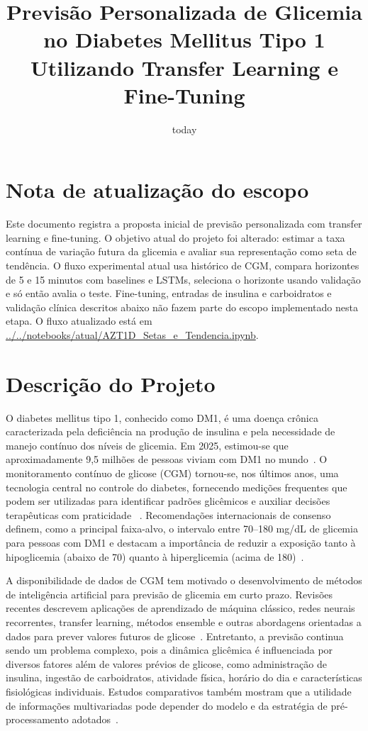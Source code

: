 \documentclass[conference]{IEEEtran}
\title{Previsão Personalizada de Glicemia no Diabetes Mellitus Tipo 1 Utilizando Transfer Learning e Fine-Tuning}
\author{
\IEEEauthorblockA{Experiência Criativa: Projeto Transformador II\\
Bacharelado em Ciência da Computação -- PUCPR
\\[3ex]
Turma 8° B -- Equipe 3 \\
Gustavo Faria Cardoso, Mateus da Silva Maciel de Lima, Pedro Costa Lyra \\
{\tt\small \{faria.cardoso, maciel.mateus, lyra.pedro, \}@pucpr.edu.br}
}
}
\date{today}
\begin{document}
\maketitle

\section*{Nota de atualização do escopo}
Este documento registra a proposta inicial de previsão personalizada com
transfer learning e fine-tuning. O objetivo atual do projeto foi alterado:
estimar a taxa contínua de variação futura da glicemia e avaliar sua
representação como seta de tendência. O fluxo experimental atual usa histórico
de CGM, compara horizontes de 5 e 15 minutos com baselines e LSTMs, seleciona o
horizonte usando validação e só então avalia o teste. Fine-tuning, entradas de
insulina e carboidratos e validação clínica descritos abaixo não fazem parte do
escopo implementado nesta etapa. O fluxo atualizado está em
\url{../../notebooks/atual/AZT1D_Setas_e_Tendencia.ipynb}.

\section{Descrição do Projeto}
\label{sec:intro}

O diabetes mellitus tipo 1, conhecido como DM1, é uma doença crônica caracterizada pela deficiência na produção de insulina e pela necessidade de manejo contínuo dos níveis de glicemia. Em 2025, estimou-se que aproximadamente 9,5 milhões de pessoas viviam com DM1 no mundo~\cite{ogle2025global}. O monitoramento contínuo de glicose (CGM) tornou-se, nos últimos anos, uma tecnologia central no controle do diabetes, fornecendo medições frequentes que podem ser utilizadas para identificar padrões glicêmicos e auxiliar decisões terapêuticas com praticidade ~\cite{ada2026technology}. Recomendações internacionais de consenso definem, como a principal faixa-alvo, o intervalo entre 70--180 mg/dL de glicemia para pessoas com DM1 e destacam a importância de reduzir a exposição tanto à hipoglicemia (abaixo de 70) quanto à hiperglicemia (acima de 180)~\cite{battelino2019tir}.

A disponibilidade de dados de CGM tem motivado o desenvolvimento de métodos de inteligência artificial para previsão de glicemia em curto prazo. Revisões recentes descrevem aplicações de aprendizado de máquina clássico, redes neurais recorrentes, transfer learning, métodos ensemble e outras abordagens orientadas a dados para prever valores futuros de glicose~\cite{khadem2026ai}. Entretanto, a previsão continua sendo um problema complexo, pois a dinâmica glicêmica é influenciada por diversos fatores além de valores prévios de glicose, como administração de insulina, ingestão de carboidratos, atividade física, horário do dia e características fisiológicas individuais. Estudos comparativos também mostram que a utilidade de informações multivariadas pode depender do modelo e da estratégia de pré-processamento adotados~\cite{nemat2024comparative}.
\end{document}
